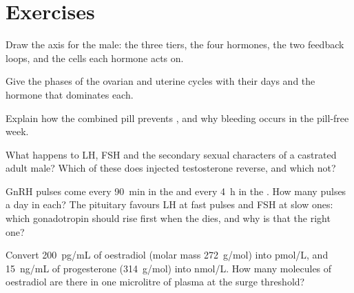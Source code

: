 \section{Exercises}

\begin{exercise}[$\star$]\label{exo:b2:reproductive-hormones:1}
Draw the axis for the male: the three tiers, the four hormones, the
two feedback loops, and the cells each hormone acts on.
\end{exercise}

\begin{exercise}[$\star$]\label{exo:b2:reproductive-hormones:2}
Give the phases of the ovarian and uterine cycles with their days
and the hormone that dominates each.
\end{exercise}

\begin{exercise}[$\star$]\label{exo:b2:reproductive-hormones:3}
Explain how the combined pill prevents , and why bleeding
occurs in the pill-free week.
\end{exercise}

\begin{exercise}[$\star$]\label{exo:b2:reproductive-hormones:4}
What happens to LH, FSH and the secondary sexual characters of a
castrated adult male? Which of these does injected testosterone
reverse, and which not?
\end{exercise}

\begin{exercise}[$\star\star$]\label{exo:b2:reproductive-hormones:5}
GnRH pulses come every \qty{90}{min} in the  and
every \qty{4}{h} in the . How many pulses a day in each?
The pituitary favours LH at fast pulses and FSH at slow ones: which
gonadotropin should rise first when the  dies, and why
is that the right one?
\end{exercise}

\begin{exercise}[$\star\star$]\label{exo:b2:reproductive-hormones:6}
Convert \qty{200}{pg/mL} of oestradiol (molar mass
\qty{272}{g/mol}) into \unit{pmol/L}, and \qty{15}{ng/mL} of
progesterone (\qty{314}{g/mol}) into \unit{nmol/L}. How many
molecules of oestradiol are there in one microlitre of plasma at
the surge threshold?
\end{exercise}

